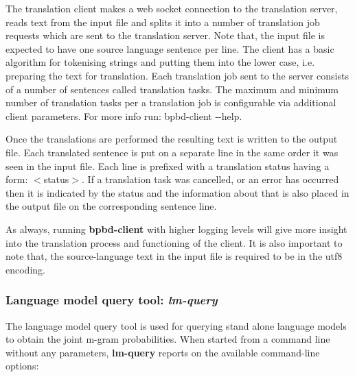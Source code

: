  The translation client makes a web socket connection to the translation server, reads text from the input file and splits it into a number of translation job requests which are sent to the translation server. Note that, the input file is expected to have one source language sentence per line. The client has a basic algorithm for tokenising strings and putting them into the lower case, i.\+e. preparing the text for translation. Each translation job sent to the server consists of a number of sentences called translation tasks. The maximum and minimum number of translation tasks per a translation job is configurable via additional client parameters. For more info run\+: {\ttfamily bpbd-\/client -\/-\/help}.

Once the translations are performed the resulting text is written to the output file. Each translated sentence is put on a separate line in the same order it was seen in the input file. Each line is prefixed with a translation status having a form\+: {\ttfamily $<$status$>$}. If a translation task was cancelled, or an error has occurred then it is indicated by the status and the information about that is also placed in the output file on the corresponding sentence line.

As always, running {\bfseries bpbd-\/client} with higher logging levels will give more insight into the translation process and functioning of the client. It is also important to note that, the source-\/language text in the input file is required to be in the utf8 encoding.

\subsubsection*{Language model query tool\+: {\itshape lm-\/query}}

The language model query tool is used for querying stand alone language models to obtain the joint m-\/gram probabilities. When started from a command line without any parameters, {\bfseries lm-\/query} reports on the available command-\/line options\+:


